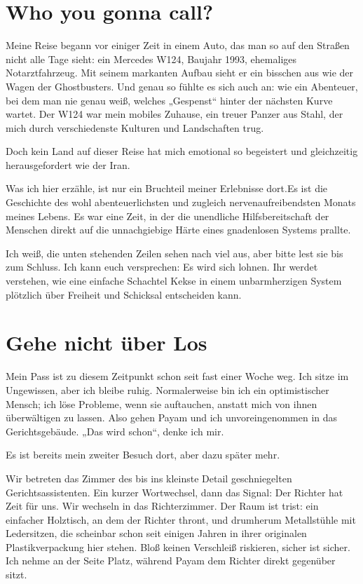 \chapter*{Who you gonna call?}

Meine Reise begann vor einiger Zeit in einem Auto, das man so auf den Straßen nicht alle Tage sieht: ein Mercedes W124, Baujahr 1993, ehemaliges Notarztfahrzeug. Mit seinem markanten Aufbau sieht er ein bisschen aus wie der Wagen der Ghostbusters. Und genau so fühlte es sich auch an: wie ein Abenteuer, bei dem man nie genau weiß, welches „Gespenst“ hinter der nächsten Kurve wartet. Der W124 war mein mobiles Zuhause, ein treuer Panzer aus Stahl, der mich durch verschiedenste Kulturen und Landschaften trug.

Doch kein Land auf dieser Reise hat mich emotional so begeistert und gleichzeitig herausgefordert wie der Iran.

Was ich hier erzähle, ist nur ein Bruchteil meiner Erlebnisse dort.Es ist die Geschichte des wohl abenteuerlichsten und zugleich nervenaufreibendsten Monats meines Lebens. Es war eine Zeit, in der die unendliche Hilfsbereitschaft der Menschen direkt auf die unnachgiebige Härte eines gnadenlosen Systems prallte.

Ich weiß, die unten stehenden Zeilen sehen nach viel aus, aber bitte lest sie bis zum Schluss. Ich kann euch versprechen: Es wird sich lohnen. Ihr werdet verstehen, wie eine einfache Schachtel Kekse in einem unbarmherzigen System plötzlich über Freiheit und Schicksal entscheiden kann.

\chapter*{Gehe nicht über Los}

Mein Pass ist zu diesem Zeitpunkt schon seit fast einer Woche weg. Ich sitze im Ungewissen, aber ich bleibe ruhig. Normalerweise bin ich ein optimistischer Mensch; ich löse Probleme, wenn sie auftauchen, anstatt mich von ihnen überwältigen zu lassen. Also gehen Payam und ich unvoreingenommen in das Gerichtsgebäude. „Das wird schon“, denke ich mir.

Es ist bereits mein zweiter Besuch dort, aber dazu später mehr.

Wir betreten das Zimmer des bis ins kleinste Detail geschniegelten Gerichtsassistenten. Ein kurzer Wortwechsel, dann das Signal: Der Richter hat Zeit für uns. Wir wechseln in das Richterzimmer. Der Raum ist trist: ein einfacher Holztisch, an dem der Richter thront, und drumherum Metallstühle mit Ledersitzen, die scheinbar schon seit einigen Jahren in ihrer originalen Plastikverpackung hier stehen. Bloß keinen Verschleiß riskieren, sicher ist sicher. Ich nehme an der Seite Platz, während Payam dem Richter direkt gegenüber sitzt.

